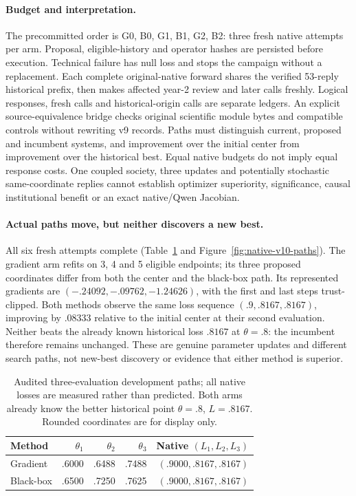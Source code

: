 \paragraph{Budget and interpretation.}
The precommitted order is G0, B0, G1, B1, G2, B2: three fresh native attempts
per arm. Proposal, eligible-history and operator hashes are persisted before
execution. Technical failure has null loss and stops the campaign without a
replacement. Each complete original-native forward shares the verified
53-reply historical prefix, then makes affected year-2 review and later calls
freshly. Logical responses, fresh calls and historical-origin calls are
separate ledgers. An explicit source-equivalence bridge checks original
scientific module bytes and compatible controls without rewriting v9 records.
Paths must distinguish current, proposed and incumbent systems, and improvement
over the initial center from improvement over the historical best. Equal native
budgets do not imply equal response costs. One coupled society, three updates
and potentially stochastic same-coordinate replies cannot establish optimizer
superiority, significance, causal institutional benefit or an exact
native/Qwen Jacobian.

\paragraph{Actual paths move, but neither discovers a new best.}
All six fresh attempts complete (Table~\ref{tab:native-v10-paths} and
Figure~\ref{fig:native-v10-paths}). The gradient arm refits on 3, 4 and 5
eligible endpoints; its three proposed coordinates differ from both the center
and the black-box path. Its represented gradients are
$(-.24092,-.09762,-1.24626)$, with the first and last steps trust-clipped.
Both methods observe the same loss sequence
$(.9,.8167,.8167)$, improving by $.08333$ relative to the initial center at
their second evaluation. Neither beats the already known historical loss
$.8167$ at $\theta=.8$: the incumbent therefore remains unchanged. These are
genuine parameter updates and different search paths, not new-best discovery
or evidence that either method is superior.

\begin{table}[t]
\caption{Audited three-evaluation development paths; all native losses are
measured rather than predicted. Both arms already know the better historical
point $\theta=.8$, $L=.8167$. Rounded coordinates are for display only.}
\label{tab:native-v10-paths}
\centering\small
\begin{tabular}{lrrrr}
\toprule
Method & $\theta_1$ & $\theta_2$ & $\theta_3$ & Native $(L_1,L_2,L_3)$ \\
\midrule
Gradient & .6000 & .6488 & .7488 & $(.9000,.8167,.8167)$ \\
Black-box & .6500 & .7250 & .7625 & $(.9000,.8167,.8167)$ \\
\bottomrule
\end{tabular}
\end{table}

